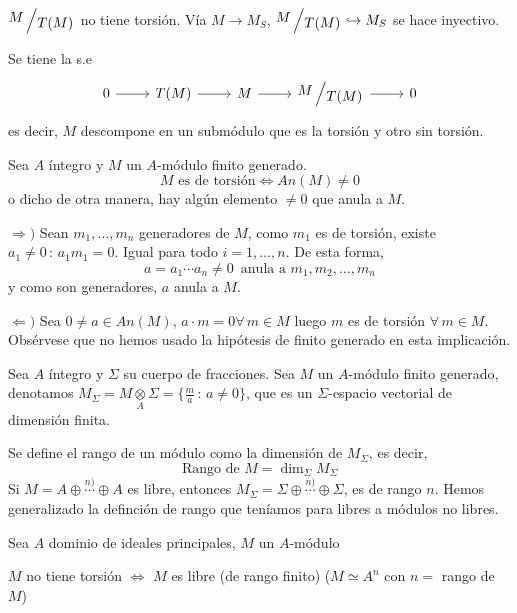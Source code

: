 \begin{prop}
    $\modulo{M}{T(M)}$ no tiene torsi\'on. V\'ia $M\longrightarrow M_S$, $\modulo{M}{T(M)} \hookrightarrow M_S$ se hace inyectivo.
\end{prop}
\begin{dem}
    Se tiene la s.e
    $$\bt 0\rar & T(M) \rar & \rar M & \modulo{M}{T(M)} \rar & 0 \et$$
    es decir, $M$ descompone en un subm\'odulo que es la torsi\'on y otro sin torsi\'on.
\end{dem}
\begin{prop}
    Sea $A$ \'integro y $M$ un $A$-m\'odulo finito generado. 
    $$M \text{ es de torsi\'on} \iff An(M) \neq 0$$
     o dicho de otra manera, hay alg\'un elemento $\neq 0$ que anula a $M$.
\end{prop}
\begin{dem}
    $\Rightarrow)$ Sean $m_1, \ldots, m_n$ generadores de $M$, como $m_1$ es de torsi\'on, existe $a_1 \neq 0 \, : \, a_1m_1=0$. Igual para todo $i=1,\ldots, n$. De esta forma,
    $$a = a_1 \cdots a_n \neq 0 \, \text{ anula a } m_1, m_2, \ldots, m_n $$
    y como son generadores, $a$ anula a $M$. 

    $\Leftarrow)$ Sea $0\neq a\in An(M)$, $a\cdot m =0 \forall \, m\in M$ luego $m$ es de torsi\'on $\forall\, m \in M$. Obs\'ervese que no hemos usado la hip\'otesis de finito generado en esta implicaci\'on.
\end{dem}
Sea $A$ \'integro y $\Sigma$ su cuerpo de fracciones. Sea $M$ un $A$-m\'odulo finito generado, denotamos $M_{\Sigma} = M \underset{A}{\otimes} \Sigma = \{\frac{m}{a} \, : \, a\neq 0\}$, que es un $\Sigma$-espacio vectorial de dimensi\'on finita.  
\begin{defi}
    Se define el rango de un m\'odulo como la dimensi\'on de $M_{\Sigma}$, es decir,
    $$\text{Rango de } M = \dim_{\Sigma} M_{\Sigma}$$
    Si $M = A \oplus \overset{n)}{\cdots} \oplus A$ es libre, entonces $M_{\Sigma}=\Sigma \oplus \overset{n)}{\cdots} \oplus \Sigma$, es de rango $n$. Hemos generalizado la definci\'on de rango que ten\'iamos para libres a m\'odulos no libres. 
\end{defi}
Sea $A$ dominio de ideales principales, $M$ un $A$-m\'odulo
\begin{teo}
$M$ no tiene torsi\'on $\iff$ $M$ es libre (de rango finito) ($M\simeq A^n$ con $n=$ rango de $M$) 
\end{teo}
